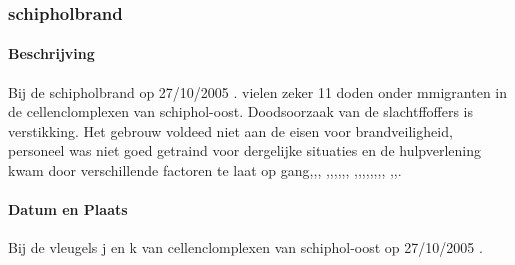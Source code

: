 \documentclass{article}
\begin{document}
	\subsubsection{schipholbrand}
			\paragraph{Beschrijving}
			Bij de schipholbrand op 27/10/2005 . 
			vielen zeker 11 doden onder mmigranten in de cellenclomplexen van schiphol-oost. Doodsoorzaak van de slachtffoffers is verstikking. Het gebrouw voldeed niet aan de eisen voor brandveiligheid, personeel was niet goed getraind voor dergelijke situaties en de hulpverlening kwam door verschillende factoren te laat op gang\cite{schipholbrand27102005video},\cite{schipholbrand27102005video},\cite{onderzoeksraad2610schipholoost},
			\cite{schipholbrandvideoargos},\cite{nunl30052023feitenoverzicht},\cite{parlementairemonitorschipholbrand},\cite{videonpoNOVA13112008},\cite{rizoomes01052014schipholbrand},\cite{heuvelkroesschipholbrandcamerabeelden},
			\cite{wikiSchipholbrand},\cite{schipholbrand27102005video},\cite{onderzoeksraad2610schipholoost},\cite{schipholbrandvideoargos},\cite{nunl30052023feitenoverzicht},\cite{singeluitgeverijenSchipholbrand},\cite{eenvandaagschipholbrand},\cite{parlementairemonitorschipholbrand},
			\cite{videonpoNOVA13112008},\cite{rizoomes01052014schipholbrand},\cite{heuvelkroesschipholbrandcamerabeelden}. \\
	\paragraph{Datum en Plaats}
 	Bij de vleugels j en k  van cellenclomplexen van schiphol-oost op 27/10/2005  . 
\end{document}
